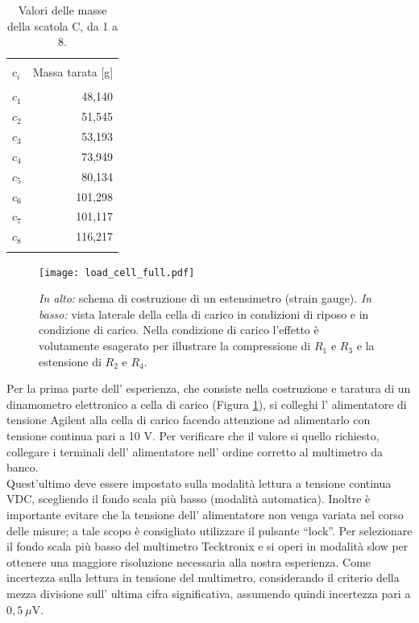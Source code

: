 \documentclass[italian, a4paper, 10pt, twocolumn]{../../style/lab_unige}
\newcommand{\reffig}[1]{Figura {\ref{#1}}}%
\begin{document}
    \begin{table}[h!]
        \centering
        \footnotesize
        \caption{Valori delle masse della scatola C, da 1 a 8.}
        \label{table:masses_c}
        \begin{tabular}{lr}
            \hline\hline\\[-1.5ex]
            $c_i$ &  Massa tarata [g] \\[+0.5ex] \hline \\[-1.5ex]     
            $c_1$ &  48,140           \\[+0.5ex]
            $c_2$ &  51,545           \\[+0.5ex]
            $c_3$ &  53,193           \\[+0.5ex]
            $c_4$ &  73,949           \\[+0.5ex]
            $c_5$ &  80,134           \\[+0.5ex]
            $c_6$ & 101,298           \\[+0.5ex]
            $c_7$ & 101,117           \\[+0.5ex]
            $c_8$ & 116,217           \\[+0.5ex] \hline \\[-1.5ex]
        \end{tabular}
    \end{table}

    \begin{figure}[b!]
        \centering
        \texttt{[image: load\_cell\_full.pdf]}
        \caption{\textit{In alto: } schema di costruzione di un estensimetro (strain gauge). \textit{In basso: } vista laterale della cella di carico in condizioni di riposo e in condizione di carico. Nella condizione di carico l'effetto è volutamente esagerato per illustrare la compressione di $R_1$ e $R_3$ e la estensione di $R_2$ e $R_4$.}
        \label{figure:load_cell}
    \end{figure}

    Per la prima parte dell’ esperienza, che consiste nella costruzione e  taratura di un dinamometro elettronico a cella di carico (\reffig{figure:load_cell}), si colleghi l’ alimentatore di tensione Agilent alla cella di carico facendo attenzione ad alimentarlo con tensione continua pari a 10 V. Per verificare che il valore si quello richiesto, collegare i terminali dell’ alimentatore nell’ ordine corretto al multimetro da banco. \\
    Quest’ultimo deve essere impostato sulla modalità lettura a tensione continua VDC, scegliendo il fondo scala più basso (modalità automatica). Inoltre è importante evitare che la tensione dell’ alimentatore non venga variata nel corso delle misure; a tale scopo è consigliato utilizzare il pulsante “lock”. Per selezionare il fondo scala più basso del multimetro Tecktronix e si operi in modalità slow per ottenere una maggiore risoluzione necessaria alla nostra esperienza. Come incertezza sulla lettura in tensione del multimetro, considerando il criterio della mezza divisione sull’ ultima cifra significativa, assumendo quindi incertezza pari a  $0,5~\mu$V. 
\end{document}
